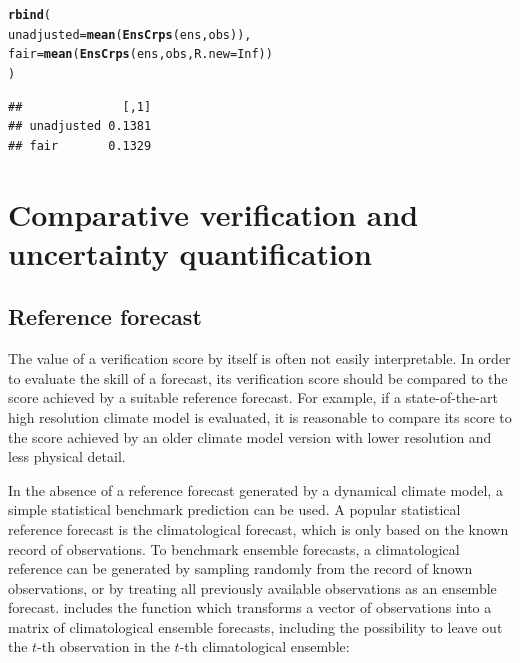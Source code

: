 \documentclass[article]{jss}\usepackage{graphicx, color}
\makeatletter
\newcommand{\hlfunctioncall}[1]{\textcolor[rgb]{0,0.501960784313725,0.752941176470588}{\textbf{#1}}}%
\newenvironment{kframe}{%
 \def\at@end@of@kframe{}%
 \ifinner\ifhmode%
  \def\at@end@of@kframe{\end{minipage}}%
  \begin{minipage}{\columnwidth}%
 \fi\fi%
 \def\FrameCommand##1{\hskip\@totalleftmargin \hskip-\fboxsep
 \colorbox{shadecolor}{##1}\hskip-\fboxsep
     \hskip-\linewidth \hskip-\@totalleftmargin \hskip\columnwidth}%
 \MakeFramed {\advance\hsize-\width
   \@totalleftmargin\z@ \linewidth\hsize
   \@setminipage}}%
 {\par\unskip\endMakeFramed%
 \at@end@of@kframe}
\newenvironment{knitrout}{}{} %
\makeatother
\begin{document}
\begin{knitrout}
\color{fgcolor}\begin{kframe}
\begin{alltt}
\hlfunctioncall{rbind}(
  unadjusted = \hlfunctioncall{mean}(\hlfunctioncall{EnsCrps}(ens, obs)), 
  fair       = \hlfunctioncall{mean}(\hlfunctioncall{EnsCrps}(ens, obs, R.new=Inf))
)
\end{alltt}
\begin{verbatim}
##              [,1]
## unadjusted 0.1381
## fair       0.1329
\end{verbatim}
\end{kframe}
\end{knitrout}





\section{Comparative verification and uncertainty quantification}


\subsection{Reference forecast}

The value of a verification score by itself is often not easily interpretable.
In order to evaluate the skill of a forecast, its verification score should be compared to the score achieved by a suitable reference forecast.
For example, if a state-of-the-art high resolution climate model is evaluated, it is reasonable to compare its score to the score achieved by an older climate model version with lower resolution and less physical detail.

In the absence of a reference forecast generated by a dynamical climate model, a simple statistical benchmark prediction can be used.
A popular statistical reference forecast is the climatological forecast, which is only based on the known record of observations.
To benchmark ensemble forecasts, a climatological reference can be generated by sampling randomly from the record of known observations, or by treating all previously available observations as an ensemble forecast.
 includes the function  which transforms a vector of observations into a matrix of climatological ensemble forecasts, including the possibility to leave out the $t$-th observation in the $t$-th climatological ensemble:
\end{document}
